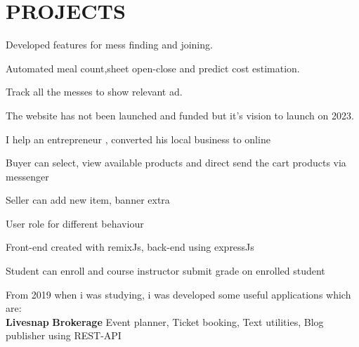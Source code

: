 \documentclass[]{deedy-resume-openfont}
\begin{document}
\begin{minipage}[t]{0.66\textwidth}

\section{PROJECTS}
\vspace{\topsep} %
\begin{tightemize}
\item Developed features for mess finding and joining.
\item  Automated meal count,sheet open-close and predict cost estimation.
\item Track all the messes to show relevant ad.
\item The website has not been launched and funded but it's vision to launch on 2023.
\end{tightemize}
\sectionsep

\begin{tightemize}
\item I help an entrepreneur , converted his local business to online
\item Buyer can select, view available products and direct send the cart products via messenger
\item Seller can add new item, banner extra
\end{tightemize}
\sectionsep

\begin{tightemize}
\item User role for different behaviour
\item Front-end created with remixJs, back-end using expressJs
\item Student can enroll and course instructor submit grade on enrolled student
\end{tightemize}
\sectionsep

From 2019 when i was studying, i was developed some useful applications which are:\\
\textbf{Livesnap}
\textbf{Brokerage} 
Event planner, Ticket booking, Text utilities, Blog publisher using REST-API
\sectionsep

\end{minipage} 
\end{document}
